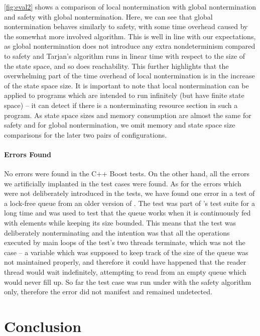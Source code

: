 \autoref{fig:eval2} shows a comparison of local nontermination with global nontermination and safety with global nontermination.
Here, we can see that global nontermination behaves similarly to safety, with some time overhead caused by the somewhat more involved algorithm.
This is well in line with our expectations, as global nontermination does not introduce any extra nondeterminism compared to safety and Tarjan's algorithm runs in linear time with respect to the size of the state space, and so does reachability.
This further highlights that the overwhelming part of the time overhead of local
nontermination is in the increase of the state space size.
It is important to note that local nontermination can be applied to programs
which are intended to run infinitely (but have finite state space) -- it can detect if there is a nonterminating resource section in such a program.
As state space sizes and memory consumption are almost the same for safety and for global nontermination, we omit memory and state space size comparisons for the later two pairs of configurations.

\paragraph{Errors Found}
%
No errors were found in the C++ Boost tests. On the other hand, all the errors
we artificially implanted in the test cases were found.  As for the errors which
were not deliberately introduced in the tests, we have found one error in a test
of a lock-free queue from an older version of \divine.  The test was part of
\divine's test suite for a long time and was used to test that the queue works
when it is continuously fed with elements while keeping its size bounded.  This
means that the test was deliberately nonterminating and the intention was that
all the operations executed by main loops of the test's two threads terminate,
which was not the case -- a variable which was supposed to keep track of the
size of the queue was not maintained properly, and therefore it could have happened
that the reader thread would wait indefinitely, attempting to read from an empty
queue which would never fill up. So far the test case was run under \divine with
the safety algorithm only, therefore the error did not manifest and remained
undetected.


\section{Conclusion} \label{sec:conclusion}

